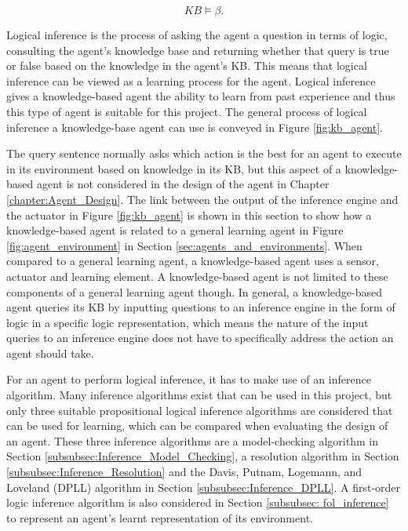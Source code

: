 \begin{equation}
	KB \models \beta.
	\label{eq:entailment_KB_query}
\end{equation}

Logical inference is the process of asking the agent a question in terms of logic, consulting the agent's knowledge base and returning whether that query is true or false based on the knowledge in the agent's KB. This means that logical inference can be viewed as a learning process for the agent. Logical inference gives a knowledge-based agent the ability to learn from past experience and thus this type of agent is suitable for this project.  The general process of logical inference a knowledge-base agent can use is conveyed in Figure \ref{fig:kb_agent}.

The query sentence normally asks which action is the best for an agent to execute in its environment based on knowledge in its KB, but this aspect of a knowledge-based agent is not considered in the design of the agent in Chapter \ref{chapter:Agent_Design}. The link between the output of the inference engine and the actuator in Figure \ref{fig:kb_agent} is shown in this section to show how a knowledge-based agent is related to a general learning agent in Figure  \ref{fig:agent_environment} in Section \ref{sec:agents_and_environments}. When compared to a general learning agent, a knowledge-based agent uses a sensor, actuator and learning element. A knowledge-based agent is not limited to these components of a general learning agent though. In general, a knowledge-based agent queries its KB by inputting questions to an inference engine in the form of logic in a specific logic representation, which means the nature of the input queries to an inference engine does not have to specifically address the action an agent should take. 

For an agent to perform logical inference, it has to make use of an inference algorithm. Many inference algorithms exist that can be used in this project, but only three suitable propositional logical inference algorithms are considered that can be used for learning, which can be compared when evaluating the design of an agent. These three inference algorithms are a model-checking algorithm in Section \ref{subsubsec:Inference_Model_Checking}, a resolution algorithm in Section \ref{subsubsec:Inference_Resolution} and the Davis, Putnam, Logemann, and Loveland (DPLL) algorithm in Section \ref{subsubsec:Inference_DPLL}. A first-order logic inference  algorithm is also considered in Section \ref{subsubsec: fol_inference} to represent an agent's learnt representation of its environment.

